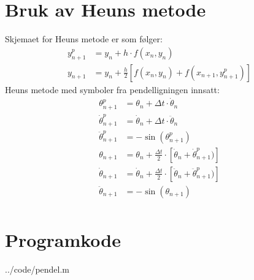 \section{Bruk av Heuns metode} %
\label{sec:bruk_av_heuns_metode}
Skjemaet for Heuns metode er som følger:
\begin{align}
  y_{n+1}^p &=  y_n + h \cdot f(x_n,y_n) \\
  y_{n+1}   &=  y_n + \frac{h}{2} \left[f(x_n,y_n)+f(x_{n+1},y_{n+1}^p)\right]
\end{align}
Heuns metode med symboler fra pendelligningen innsatt:
\begin{align}
  \theta_{n+1}^p &= \theta_n + \Delta t \cdot \dot\theta_n \\
  \dot\theta_{n+1}^p &= \dot\theta_n + \Delta t \cdot \ddot\theta_n \\
  \ddot\theta_{n+1}^p &= -\sin (\theta_{n+1}^p) \\                   
  \theta_{n+1}     &= \theta_n + \frac{\Delta t}{2} \cdot 
                      \left[\dot\theta_n+\dot\theta_{n+1}^p)\right] \\
  \dot\theta_{n+1} &= \dot\theta_n + \frac{\Delta t}{2} \cdot 
                      \left[\ddot\theta_n+\ddot\theta_{n+1}^p)\right] \\
  \ddot\theta_{n+1} &= -\sin (\theta_{n+1}) \\                   
\end{align}




\clearpage
\section{Programkode} %
\label{sec:programkode}

  {../code/pendel.m}

